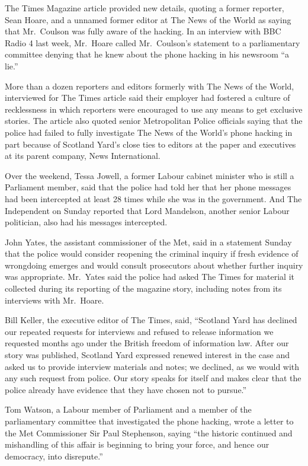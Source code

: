 ﻿\documentclass[12pt]{article}
\begin{document}
The Times Magazine article provided new details, quoting a former reporter, Sean Hoare, and a
unnamed former editor at The News of the World as saying that Mr.~Coulson was fully aware of the
hacking. In an interview with BBC Radio 4 last week, Mr.~Hoare called Mr.~Coulson's statement to a
parliamentary committee denying that he knew about the phone hacking in his newsroom ``a lie.''

More than a dozen reporters and editors formerly with The News of the World, interviewed for The
Times article said their employer had fostered a culture of recklessness in which reporters were
encouraged to use any means to get exclusive stories. The article also quoted senior Metropolitan
Police officials saying that the police had failed to fully investigate The News of the World's
phone hacking in part because of Scotland Yard's close ties to editors at the paper and executives
at its parent company, News International.

Over the weekend, Tessa Jowell, a former Labour cabinet minister who is still a Parliament member,
said that the police had told her that her phone messages had been intercepted at least 28 times
while she was in the government. And The Independent on Sunday reported that Lord Mandelson, another
senior Labour politician, also had his messages intercepted.

John Yates, the assistant commissioner of the Met, said in a statement Sunday that the police would
consider reopening the criminal inquiry if fresh evidence of wrongdoing emerges and would consult
prosecutors about whether further inquiry was appropriate. Mr.~Yates said the police had asked The
Times for material it collected during its reporting of the magazine story, including notes from its
interviews with Mr.~Hoare.

Bill Keller, the executive editor of The Times, said, ``Scotland Yard has declined our repeated
requests for interviews and refused to release information we requested months ago under the British
freedom of information law. After our story was published, Scotland Yard expressed renewed interest
in the case and asked us to provide interview materials and notes; we declined, as we would with any
such request from police. Our story speaks for itself and makes clear that the police already have
evidence that they have chosen not to pursue.''

Tom Watson, a Labour member of Parliament and a member of the parliamentary committee that
investigated the phone hacking, wrote a letter to the Met Commissioner Sir Paul Stephenson, saying
``the historic continued and mishandling of this affair is beginning to bring your force, and hence
our democracy, into disrepute.''
\end{document}
